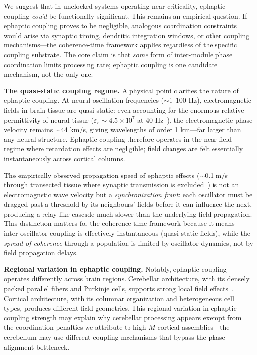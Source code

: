 \documentclass[12pt]{article}
\begin{document}
We suggest that in unclocked systems operating near criticality, ephaptic coupling \emph{could} be functionally significant. This remains an empirical question. If ephaptic coupling proves to be negligible, analogous coordination constraints would arise via synaptic timing, dendritic integration windows, or other coupling mechanisms---the coherence-time framework applies regardless of the specific coupling substrate. The core claim is that \emph{some} form of inter-module phase coordination limits processing rate; ephaptic coupling is one candidate mechanism, not the only one.

\textbf{The quasi-static coupling regime.} A physical point clarifies the nature of ephaptic coupling. At neural oscillation frequencies ($\sim$1--100 Hz), electromagnetic fields in brain tissue are quasi-static: even accounting for the enormous relative permittivity of neural tissue ($\varepsilon_r \sim 4.5 \times 10^7$ at 40 Hz~\cite{gabriel1996}), the electromagnetic phase velocity remains $\sim$44 km/s, giving wavelengths of order 1 km---far larger than any neural structure. Ephaptic coupling therefore operates in the near-field regime where retardation effects are negligible; field changes are felt essentially instantaneously across cortical columns.

The empirically observed propagation speed of ephaptic effects ($\sim$0.1 m/s through transected tissue where synaptic transmission is excluded~\cite{subramanian2022}) is not an electromagnetic wave velocity but a \emph{synchronization front}: each oscillator must be dragged past a threshold by its neighbours' fields before it can influence the next, producing a relay-like cascade much slower than the underlying field propagation. This distinction matters for the coherence time framework because it means inter-oscillator coupling is effectively instantaneous (quasi-static fields), while the \emph{spread of coherence} through a population is limited by oscillator dynamics, not by field propagation delays.

\textbf{Regional variation in ephaptic coupling.} Notably, ephaptic coupling operates differently across brain regions. Cerebellar architecture, with its densely packed parallel fibers and Purkinje cells, supports strong local field effects~\cite{han2018}. Cortical architecture, with its columnar organization and heterogeneous cell types, produces different field geometries. This regional variation in ephaptic coupling strength may explain why cerebellar processing appears exempt from the coordination penalties we attribute to high-$M$ cortical assemblies---the cerebellum may use different coupling mechanisms that bypass the phase-alignment bottleneck.
\end{document}
